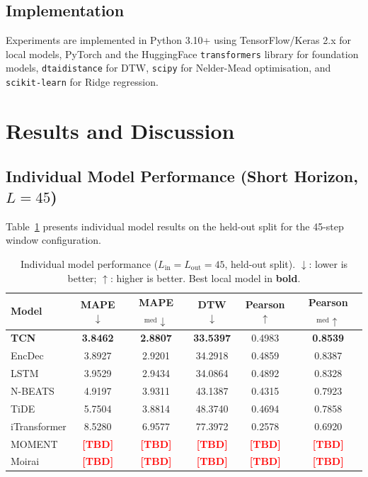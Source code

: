 \documentclass[11pt,a4paper]{article}
\newcommand{\TBD}{\textcolor{red}{\textbf{[TBD]}}}
\begin{document}
\subsection{Implementation}

Experiments are implemented in Python 3.10+ using TensorFlow/Keras 2.x for
local models, PyTorch and the HuggingFace \texttt{transformers} library for
foundation models, \texttt{dtaidistance} for DTW, \texttt{scipy} for
Nelder-Mead optimisation, and \texttt{scikit-learn} for Ridge regression.

\section{Results and Discussion}
\label{sec:results}

\subsection{Individual Model Performance (Short Horizon, $L=45$)}

Table~\ref{tab:individual_45} presents individual model results on the held-out
split for the 45-step window configuration.

\begin{table}[H]
  \centering
  \caption{Individual model performance ($L_{\mathrm{in}}=L_{\mathrm{out}}=45$,
           held-out split). $\downarrow$: lower is better;
           $\uparrow$: higher is better.  Best local model in \textbf{bold}.}
  \label{tab:individual_45}
  \begin{tabular}{lccccc}
    \toprule
    Model & MAPE$\downarrow$ & MAPE$_{\mathrm{med}}\downarrow$ &
            DTW$\downarrow$ & Pearson$\uparrow$ &
            Pearson$_{\mathrm{med}}\uparrow$ \\
    \midrule
    \textbf{TCN}    & \textbf{3.8462} & \textbf{2.8807} & \textbf{33.5397}
                    & 0.4983 & \textbf{0.8539} \\
    EncDec          & 3.8927 & 2.9201 & 34.2918 & 0.4859 & 0.8387 \\
    LSTM            & 3.9529 & 2.9434 & 34.0864 & 0.4892 & 0.8328 \\
    N-BEATS         & 4.9197 & 3.9311 & 43.1387 & 0.4315 & 0.7923 \\
    TiDE            & 5.7504 & 3.8814 & 48.3740 & 0.4694 & 0.7858 \\
    iTransformer    & 8.5280 & 6.9577 & 77.3972 & 0.2578 & 0.6920 \\
    \midrule
    MOMENT          & \TBD   & \TBD   & \TBD    & \TBD   & \TBD   \\
    Moirai          & \TBD   & \TBD   & \TBD    & \TBD   & \TBD   \\
    \bottomrule
  \end{tabular}
\end{table}
\end{document}
